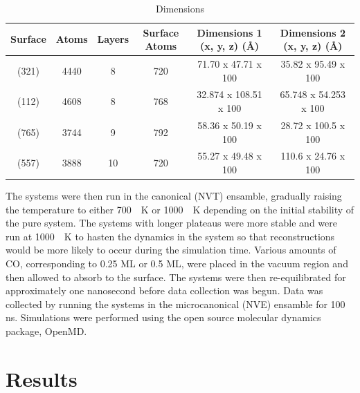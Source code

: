 \begin{table}[ht]
\caption{Dimensions}
\centering
\begin{tabular}{c c c c c c}
\hline\hline
Surface & Atoms & Layers & Surface Atoms & Dimensions 1 (x, y, z) (\AA) & Dimensions 2 (x, y, z) (\AA)\\
\hline
(321) & 4440 & 8 & 720 & 71.70 x 47.71 x 100 & 35.82 x 95.49 x 100\\
(112) & 4608 & 8 & 768 & 32.874 x 108.51 x 100 & 65.748 x 54.253 x 100\\
(765) & 3744 & 9 & 792 & 58.36 x 50.19 x 100 & 28.72 x 100.5 x 100\\
(557) & 3888 & 10 & 720 & 55.27 x 49.48 x 100 & 110.6 x 24.76 x 100\\
\hline
\end{tabular}
\label{tab:dimensions}
\end{table}

The systems were then run in the canonical (NVT) ensamble, gradually raising
the temperature to either 700\ ~K or 1000\ ~K depending on the initial
stability of the pure system.  The systems with longer plateaus were more
stable and were run at 1000\ ~K to hasten the dynamics in the system so that
reconstructions would be more likely to occur during the simulation time.
Various amounts of CO, corresponding to 0.25 ML or 0.5 ML, were placed in the
vacuum region and then allowed to absorb to the surface. The systems were then
re-equilibrated for approximately one nanosecond before data collection was
begun.  Data was collected by running the systems in the microcanonical (NVE)
ensamble for 100 ns.  Simulations were performed using the open source
molecular dynamics package, OpenMD.\citep{Fennell:2006xq, Meineke:2005pt,
openmd} 

\section{Results}




